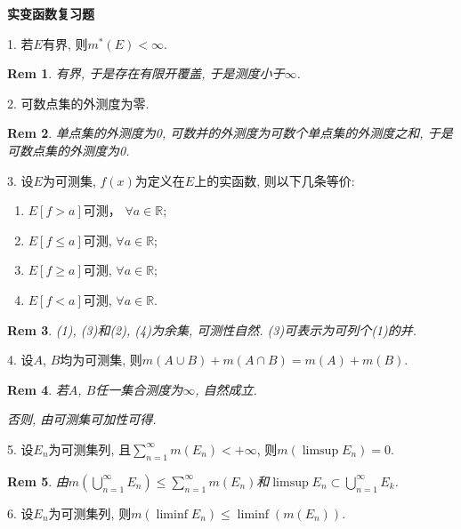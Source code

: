 \documentclass[UTF8]{article}
\newtheorem*{remark}{Rem}
\begin{document}
    \begin{center}
    \Huge \textbf{实变函数复习题}\par
    \end{center}
    1. 若$E$有界, 则$m^{*}(E)<\infty$.\par
    \begin{remark}
        有界, 于是存在有限开覆盖, 于是测度小于$\infty$.\par
    \end{remark}
    2. 可数点集的外测度为零.\par
    \begin{remark}
        单点集的外测度为0, 可数并的外测度为可数个单点集的外测度之和, 于是可数点集的外测度为0.\par
    \end{remark}
    3. 设$E$为可测集, $f(x)$为定义在$E$上的实函数, 则以下几条等价:\par
    \begin{enumerate}
        \item $E\left[f>a\right]$可测， $\forall a\in\mathbb{R}$;
        \item $E\left[f\leqslant a\right]$可测, $\forall a\in\mathbb{R}$;
        \item $E\left[f\geqslant a\right]$可测, $\forall a\in\mathbb{R}$;
        \item $E\left[f<a\right]$可测, $\forall a\in\mathbb{R}$.
    \end{enumerate}
    \begin{remark}
        (1), (3)和(2), (4)为余集, 可测性自然. (3)可表示为可列个(1)的并.\par
    \end{remark}
    4. 设$A$, $B$均为可测集, 则$m(A\cup B)+ m(A\cap B)=m(A)+m(B)$.\par
    \begin{remark}
        若$A$, $B$任一集合测度为$\infty$, 自然成立.\par
        否则, 由可测集可加性可得.\par    
    \end{remark}
    5. 设$E_n$为可测集列, 且$\sum_{n=1}^{\infty}m(E_n)<+\infty$, 则$m(\limsup E_n)=0$.\par
    \begin{remark}
        由$m\left(\bigcup_{n=1}^{\infty}E_n\right)\leqslant \sum_{n=1}^{\infty}m(E_n)$和$\limsup E_n\subset \bigcup_{n=1}^{\infty}E_k$.
    \end{remark}
    6. 设$E_n$为可测集列, 则$m\left(\liminf E_n\right)\leqslant \liminf (m(E_n))$.\par
\end{document}
